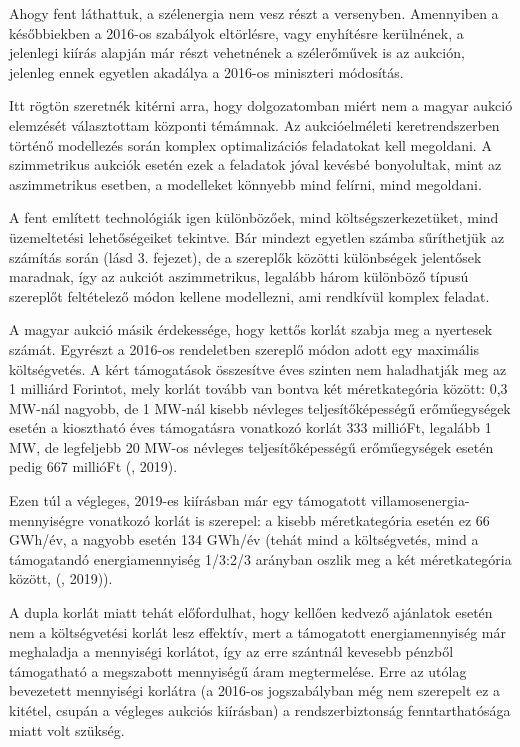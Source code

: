 \documentclass[twoside, magyar, showtrims]{corvinusphd}
\begin{document}
Ahogy fent láthattuk, a szélenergia
nem vesz részt a versenyben. Amennyiben a későbbiekben
a 2016-os szabályok eltörlésre, vagy enyhítésre
kerülnének, a jelenlegi kiírás alapján már
részt vehetnének a szélerőművek is az aukción,
jelenleg ennek egyetlen akadálya a 2016-os miniszteri módosítás.

Itt rögtön szeretnék kitérni arra, hogy dolgozatomban miért nem a magyar aukció elemzését
választottam központi témámnak. Az aukcióelméleti keretrendszerben történő
modellezés során komplex optimalizációs feladatokat kell megoldani.
A szimmetrikus aukciók esetén ezek a feladatok jóval kevésbé bonyolultak,
mint az aszimmetrikus esetben, a modelleket könnyebb mind felírni, mind megoldani.

A fent említett technológiák igen különbözőek, mind költségszerkezetüket,
mind üzemeltetési lehetőségeiket tekintve. Bár mindezt egyetlen számba
sűríthetjük az  számítás során (lásd 3. fejezet), 
de a szereplők közötti különbségek jelentősek maradnak, így az aukciót
aszimmetrikus, legalább három különböző típusú szereplőt feltételező
módon kellene modellezni, ami rendkívül komplex feladat.

A magyar aukció másik érdekessége,
hogy kettős korlát szabja meg a nyertesek számát.
Egyrészt a 2016-os rendeletben szereplő
módon adott egy maximális költségvetés.
A kért támogatások összesítve éves szinten
nem haladhatják meg az 1 milliárd Forintot, 
mely korlát tovább van bontva két méretkategória között:
0,3 MW-nál nagyobb, de 1 MW-nál
kisebb névleges teljesítőképességű erőműegységek
esetén a kiosztható éves támogatásra
vonatkozó korlát 333 millióFt, legalább 1 MW, de legfeljebb 20 MW-os
névleges teljesítőképességű erőműegységek 
esetén pedig 667 millióFt (, 2019).

Ezen túl a végleges, 2019-es kiírásban már egy
támogatott villamosenergia-mennyiségre vonatkozó korlát
is szerepel: a kisebb méretkategória esetén ez 66 GWh/év,
a nagyobb esetén 134 GWh/év (tehát mind a költségvetés,
mind a támogatandó energiamennyiség 1/3:2/3 arányban oszlik
meg a két méretkategória között, (, 2019)).

A dupla korlát miatt tehát előfordulhat, hogy kellően kedvező ajánlatok
esetén nem a költségvetési korlát lesz effektív, mert a támogatott energiamennyiség
már meghaladja a mennyiségi korlátot, így az erre szántnál kevesebb
pénzből támogatható a megszabott mennyiségű áram megtermelése.
Erre az utólag bevezetett mennyiségi korlátra (a 2016-os jogszabályban még
nem szerepelt ez a kitétel, csupán a végleges aukciós kiírásban)
a rendszerbiztonság fenntarthatósága miatt volt szükség.
\end{document}
